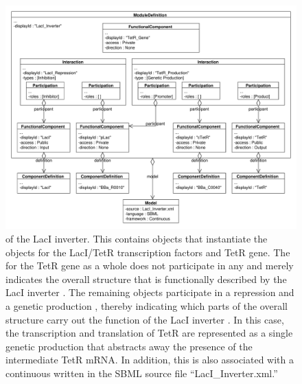 \begin{figure}[ht]
\begin{center}
\includegraphics[width=\textwidth]{example_uml/toggle_3}
\caption[]{ of the LacI inverter. This  contains  objects that instantiate the  objects for the LacI/TetR transcription factors and TetR gene. The  for the TetR gene as a whole does not participate in any  and merely indicates the overall structure that is functionally described by the LacI inverter . The remaining  objects participate in a repression  and a genetic production , thereby indicating which parts of the overall structure carry out the function of the LacI inverter . In this case, the transcription and translation of TetR are represented as a single genetic production  that abstracts away the presence of the intermediate TetR mRNA.  In addition, this  is also associated with a continuous  written in the SBML source file ``LacI\_Inverter.xml.''}
\label{uml:ex_mod_def}
\end{center}
\end{figure}

